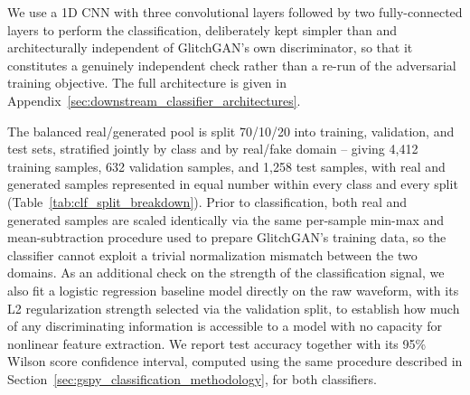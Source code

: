 \documentclass[reprint,nofootinbib,amsmath,amssymb,aps,floatfix]{revtex4-2}
\begin{document}
We use a 1D CNN with three convolutional layers followed by two fully-connected layers to perform the classification, deliberately kept simpler than and architecturally independent of GlitchGAN's own discriminator, so that it constitutes a genuinely independent check rather than a re-run of the adversarial training objective. 
The full architecture is given in Appendix~\ref{sec:downstream_classifier_architectures}. 

The balanced real/generated pool is split 70/10/20 into training, validation, and test sets, stratified jointly by class and by real/fake domain -- giving 4{,}412 training samples, 632 validation samples, and 1{,}258 test samples, with real and generated samples represented in equal number within every class and every split (Table~\ref{tab:clf_split_breakdown}). 
Prior to classification, both real and generated samples are scaled identically via the same per-sample min-max and mean-subtraction procedure used to prepare GlitchGAN's training data, so the classifier cannot exploit a trivial normalization mismatch between the two domains. 
As an additional check on the strength of the classification signal, we also fit a logistic regression baseline model directly on the raw waveform, with its L2 regularization strength selected via the validation split, to establish how much of any discriminating information is accessible to a model with no capacity for nonlinear feature extraction. We report test accuracy together with its 95\% Wilson score confidence interval, computed using the same procedure described in Section~\ref{sec:gspy_classification_methodology}, for both classifiers.
\end{document}
